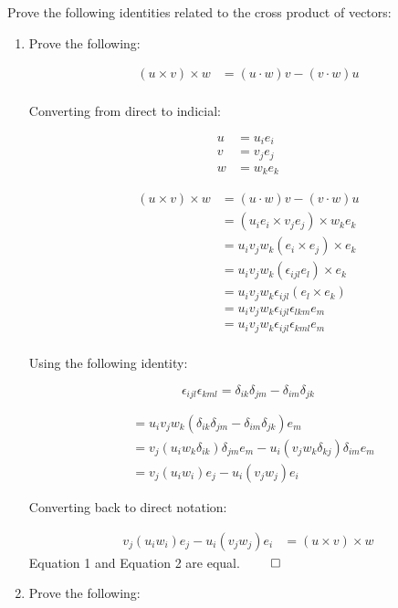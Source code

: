 \begin{problem}
    \normalfont
    Prove the following identities related to the cross product of vectors:
\begin{enumerate}
    \item 
    Prove the following:

\begin{align*}
(u\times v)\times w&=(u\cdot w)v-(v\cdot w)u\tag{1}\\[10pt]
\end{align*}


Converting from direct to indicial:

\begin{align*}
u&=u_{i}e_{i}\\[10pt]
v&=v_{j}e_{j}\\[10pt]
w&=w_{k}e_{k}
\end{align*}


\begin{align*}
(u\times v)\times w&=(u\cdot w)v-(v\cdot w)u\\[10pt]
&=(u_{i}e_{i}\times v_{j}e_{j})\times w_{k}e_{k}\\[10pt]
&=u_{i}v_{j}w_{k}(e_{i}\times e_{j})\times e_{k}\\[10pt]
&=u_{i}v_{j}w_{k}(\epsilon_{ijl}e_{l})\times e_{k}\\[10pt]
&=u_{i}v_{j}w_{k}\epsilon_{ijl}(e_{l}\times e_{k})\\[10pt]
&=u_{i}v_{j}w_{k}\epsilon_{ijl}\epsilon_{lkm}e_{m}\\[10pt]
&=u_{i}v_{j}w_{k}\epsilon_{ijl}\epsilon_{kml}e_{m}\\[10pt]
\end{align*}


Using the following identity:

$$
\epsilon_{ijl}\epsilon_{kml}=\delta_{ik}\delta_{jm}-\delta_{im}\delta_{jk}
$$


\begin{align*}
&=u_{i}v_{j}w_{k}(\delta_{ik}\delta_{jm}-\delta_{im}\delta_{jk})e_{m}\\[10pt]
&=v_{j}(u_{i}w_{k}\delta_{ik})\delta_{jm}e_{m}-u_{i}(v_{j}w_{k}\delta_{kj})\delta_{im}e_{m}\\[10pt]
&=v_{j}(u_{i}w_{i})e_{j}-u_{i}(v_{j}w_{j})e_{i}
\end{align*}

Converting back to direct notation:

\begin{align*}
v_{j}(u_{i}w_{i})e_{j}-u_{i}(v_{j}w_{j})e_{i}&=(u\times v)\times w\tag{2}
\end{align*}
Equation 1 and Equation 2 are equal. $\qed$
\vspace*{1cm}
\item
    Prove the following:



\end{enumerate}
\end{problem}
